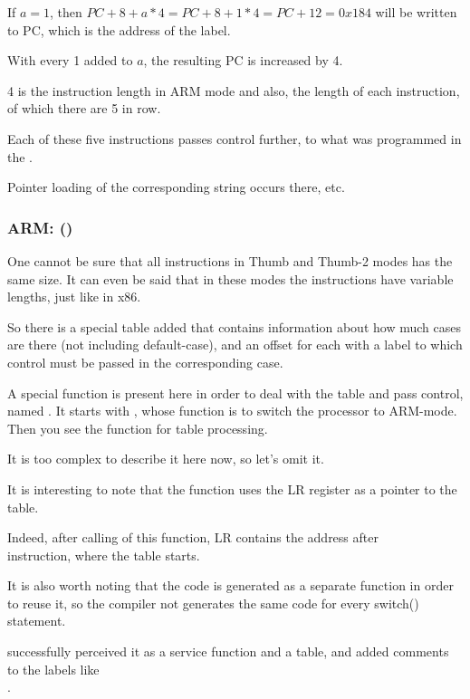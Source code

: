 If $a=1$, then $PC+8+a*4 = PC+8+1*4 = PC+12 = 0x184$ will be written to \ac{PC},
which is the address of the  label.

With every 1 added to $a$, the resulting \ac{PC} is increased by 4.

4 is the instruction length in ARM mode and also, the length of each  instruction,
of which there are 5 in row.

Each of these five  instructions passes control further, to what was programmed in the .

Pointer loading of the corresponding string occurs there, etc.

\subsubsection{ARM: \OptimizingKeilVI (\ThumbMode)}




One cannot be sure that all instructions in Thumb and Thumb-2 modes has the same size.
It can even be said that in these modes the instructions have variable lengths, just like in x86.


So there is a special table added that contains information about how much cases are there (not including 
default-case), and an offset for each with a label to which control must be passed in 
the corresponding case.


A special function is present here in order to deal with the table and pass control, named
. 
It starts with , whose function is to switch the processor to ARM-mode.
Then you see the function for table processing. 

It is too complex to describe it here now, so let's omit it.


It is interesting to note that the function uses the \ac{LR} register as a pointer to the table.

Indeed, after calling of this function, \ac{LR} contains the address after\\
 instruction, where the table starts.

It is also worth noting that the code is generated as a separate function in order to reuse it, 
so the compiler not generates the same code for every switch() statement.

\IDA successfully perceived it as a service function and a table, and added comments to the labels like\\
.

